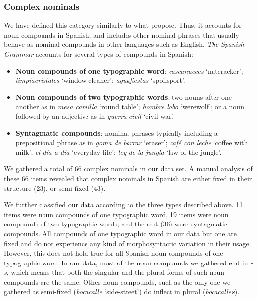 \documentclass[output=paper]{langsci/langscibook}
\begin{document}
\subsubsection{Complex nominals}
\label{ssssec:complexNominals}

We have defined this category similarly to what \citet{Atkins:2001} propose.
Thus, it accounts for noun compounds in Spanish, and includes other nominal phrases that usually behave as nominal compounds in other languages such as English.
\textit{The Spanish Grammar} \citeyearpar{RAE:2010} accounts for several types of compounds in Spanish:

\begin{itemize}
\item \textbf{Noun compounds of one typographic word}: \textit{cascanueces} `nutcracker';
\textit{limpiacristales} `window cleaner';
\textit{aguafiestas} `spoilsport'.
\item \textbf{Noun compounds of two typographic words}: two nouns after one another as in \textit{mesa camilla} `round table';
\textit{hombre lobo} `werewolf'; or a noun followed by an adjective as in \textit{guerra civil} `civil war'.
\item \textbf{Syntagmatic compounds}: nominal phrases typically including a prepositional phrase as in \textit{goma de borrar} `eraser';
\textit{café con leche} `coffee with milk';
\textit{el día a día} `everyday life';
\textit{ley de la jungla} `law of the jungle'.
\end{itemize}

We gathered a total of 66 complex nominals in our data set.
A manual analysis of these 66 items revealed that complex nominals in Spanish are either fixed in their structure (23), or semi-fixed (43).

We further classified our data according to the three types described above.
11 items were noun compounds of one typographic word, 19 items were noun compounds of two typographic words, and the rest (36) were syntagmatic compounds.
All compounds of one typographic word in our data but one are fixed and do not experience any kind of morphosyntactic variation in their usage.
However, this does not hold true for all Spanish noun compounds of one typographic word.
In our data, most of the noun compounds we gathered end in \textit{-s}, which means that both the singular and the plural forms of such noun compounds are the same.
Other noun compounds, such as the only one we gathered as semi-fixed (\textit{bocacalle} `side-street') do inflect in plural (\textit{bocacalle\textbf{s}}).
\end{document}
